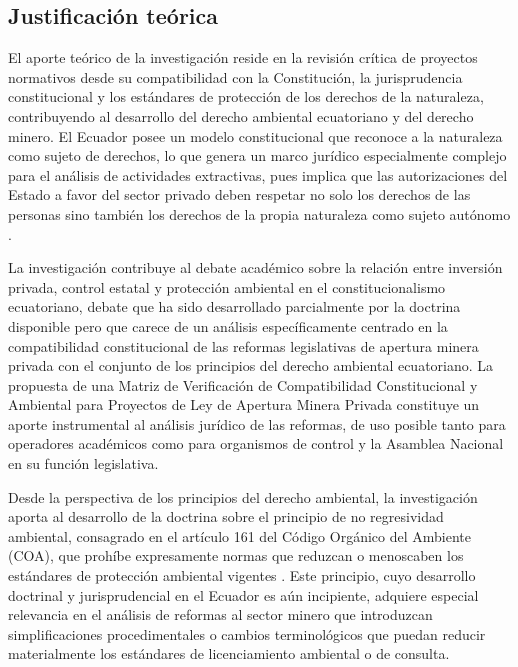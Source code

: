 \subsection{Justificación teórica}

El aporte teórico de la investigación reside en la revisión crítica de proyectos normativos desde su compatibilidad con la Constitución, la jurisprudencia constitucional y los estándares de protección de los derechos de la naturaleza, contribuyendo al desarrollo del derecho ambiental ecuatoriano y del derecho minero. El Ecuador posee un modelo constitucional que reconoce a la naturaleza como sujeto de derechos, lo que genera un marco jurídico especialmente complejo para el análisis de actividades extractivas, pues implica que las autorizaciones del Estado a favor del sector privado deben respetar no solo los derechos de las personas sino también los derechos de la propia naturaleza como sujeto autónomo \parencite{cce_1149_19_jp_21,lozano_espinosa_2023,ochoa_jimenez_2024}.

La investigación contribuye al debate académico sobre la relación entre inversión privada, control estatal y protección ambiental en el constitucionalismo ecuatoriano, debate que ha sido desarrollado parcialmente por la doctrina disponible \parencite{grefa_valencia_2021,peck_et_al_2024,sanchez_romero_et_al_2026} pero que carece de un análisis específicamente centrado en la compatibilidad constitucional de las reformas legislativas de apertura minera privada con el conjunto de los principios del derecho ambiental ecuatoriano. La propuesta de una Matriz de Verificación de Compatibilidad Constitucional y Ambiental para Proyectos de Ley de Apertura Minera Privada constituye un aporte instrumental al análisis jurídico de las reformas, de uso posible tanto para operadores académicos como para organismos de control y la Asamblea Nacional en su función legislativa.

Desde la perspectiva de los principios del derecho ambiental, la investigación aporta al desarrollo de la doctrina sobre el principio de no regresividad ambiental, consagrado en el artículo 161 del Código Orgánico del Ambiente (COA), que prohíbe expresamente normas que reduzcan o menoscaben los estándares de protección ambiental vigentes \parencite[art.~161]{coa_2017}. Este principio, cuyo desarrollo doctrinal y jurisprudencial en el Ecuador es aún incipiente, adquiere especial relevancia en el análisis de reformas al sector minero que introduzcan simplificaciones procedimentales o cambios terminológicos que puedan reducir materialmente los estándares de licenciamiento ambiental o de consulta.

